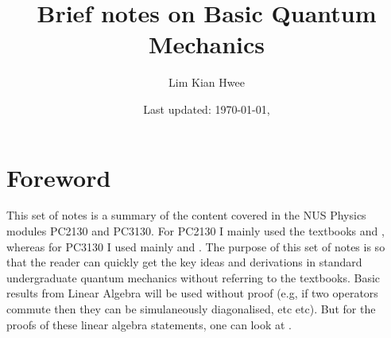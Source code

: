 \documentclass[a4paper,12pt,oneside,onecolumn,final]{memoir} %
\title{Brief notes on Basic Quantum Mechanics}
\author{Lim Kian Hwee}
\date{\small Last updated: \today, \currenttime} %
\numberwithin{equation}{chapter} %
\theoremstyle{plain}
\theoremstyle{remark}
\theoremstyle{plain}
\theoremstyle{definition}
\theoremstyle{remark}
\begin{document}
  \frontmatter
  \maketitle
  \begin{KeepFromToc}
    \tableofcontents %
  \end{KeepFromToc}
  \chapter{Foreword}
    This set of notes is a summary of the content covered in the NUS Physics
    modules PC2130 and PC3130. For PC2130 I mainly used the textbooks
    \cite{schwindt2015conceptual} and \cite{shankar1994principles}, whereas
    for PC3130 I used mainly \cite{zettili2009quantum} and
    \cite{cohen1992quantum}. The purpose of this set of notes is so that the
    reader can quickly get the key ideas and derivations in standard
    undergraduate quantum mechanics without referring to the textbooks. Basic
    results from Linear Algebra will be used without proof (e.g, if two
    operators commute then they can be simulaneously diagonalised, etc etc).
    But for the proofs of these linear algebra statements, one can look at
    \cite{nielsen_chuang_2010}.

    \printbibliography[type=book, heading=subbibliography,title={References}]


  \mainmatter
    
  
\end{document}
